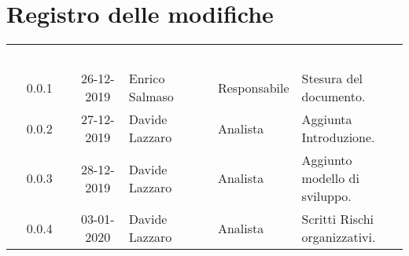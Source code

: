 \section*{Registro delle modifiche}
{
\renewcommand{\arraystretch}{1.5}
\centering
\begin{longtable}{ c c  C{4cm}  C{3cm} C{4cm}}
\textcolor{white}{\textbf{Versione}} & \textcolor{white}{\textbf{Data}} & \textcolor{white}{\textbf{Nominativo}} & \textcolor{white}{\textbf{Ruolo}} & \textcolor{white}{\textbf{Descrizione}}\\	


0.0.1 & 26-12-2019 & Enrico Salmaso & Responsabile & Stesura del documento.  \\	
0.0.2 & 27-12-2019 & Davide Lazzaro & Analista & Aggiunta Introduzione. \\
0.0.3 & 28-12-2019 & Davide Lazzaro & Analista & Aggiunto modello di sviluppo.\\	
0.0.4 & 03-01-2020 & Davide Lazzaro & Analista & Scritti Rischi organizzativi. \\
		
\end{longtable}
}